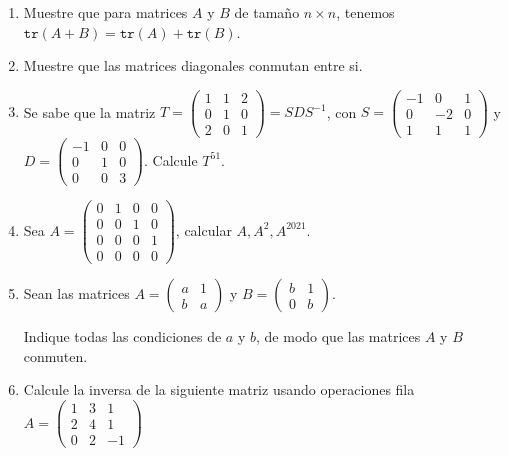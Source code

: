 \documentclass[12pt]{article}
\theoremstyle{exampstyle}
\theoremstyle{definition}
\theoremstyle{break}
\numberwithin{equation}{section}
\begin{document}
\begin{enumerate}

 \item Muestre que para matrices $A$ y $B$ de tamaño $n \times n$, tenemos $\texttt{tr}(A+B)=\texttt{tr}(A)+\texttt{tr}(B)$.
    

        \item Muestre que las matrices diagonales conmutan entre si.
        \item Se sabe que la matriz $T=\begin{pmatrix} 1 & 1 & 2 \\ 0 & 1 & 0 \\ 2 & 0 & 1 \end{pmatrix}= S D S^{-1}$, con $S=\begin{pmatrix} -1 & 0 & 1 \\ 0 & -2 & 0 \\ 1 & 1 & 1 \end{pmatrix}$ y $D= \begin{pmatrix} -1 & 0 & 0 \\ 0 & 1 & 0 \\ 0 & 0 & 3 \end{pmatrix}$. Calcule $T^{51}$. 
        
\item Sea $A=\begin{pmatrix}0&1&0&0\\
0&0&1&0\\
0&0&0&1\\
0&0&0&0\end{pmatrix}$, calcular $A,A^2,A^{2021}$.
        \item Sean las matrices  $A = \begin{pmatrix} a & 1\\ b & a 
\end{pmatrix}$ y $B = \begin{pmatrix} b & 1\\ 0 & b 
\end{pmatrix}$.

Indique todas las condiciones de $a$ y $ b$, de modo que las matrices $A$ y $B$ conmuten.

\item Calcule la inversa de la siguiente matriz usando operaciones fila
$A = \begin{pmatrix} 1 & 3 & 1\\ 2 & 4 & 1\\
0 & 2 & -1
\end{pmatrix}$
    \end{enumerate}
\end{document}
